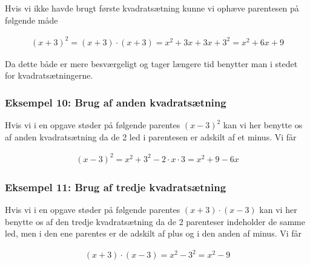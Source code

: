 Hvis vi ikke havde brugt første kvadratsætning kunne vi ophæve parentesen på følgende måde

\begin{align*}
(x + 3)^2 = (x + 3) \cdot (x + 3) = x^2 + 3x + 3x + 3^2 = x^2 + 6x + 9
\end{align*}

Da dette både er mere besværgeligt og tager længere tid benytter man i stedet for kvadratsætningerne.

\subsubsection*{Eksempel 10: Brug af anden kvadratsætning}
Hvis vi i en opgave støder på følgende parentes $(x - 3)^2$ kan vi her benytte os af anden kvadratsætning da de 2 led i parentesen er adskilt af et minus. Vi får

\begin{align*}
(x - 3)^2 = x^2 + 3^2 -2\cdot x\cdot 3 = x^2 + 9 - 6x
\end{align*}

\subsubsection*{Eksempel 11: Brug af tredje kvadratsætning}
Hvis vi i en opgave støder på følgende parentes $(x + 3)\cdot(x - 3)$ kan vi her benytte os af den tredje kvadratsætning da de 2 parenteser indeholder de samme led, men i den ene parentes er de adskilt af plus og i den anden af minus. Vi får

\begin{align*}
(x + 3)\cdot (x - 3) = x^2 - 3^2 = x^2 - 9
\end{align*}
